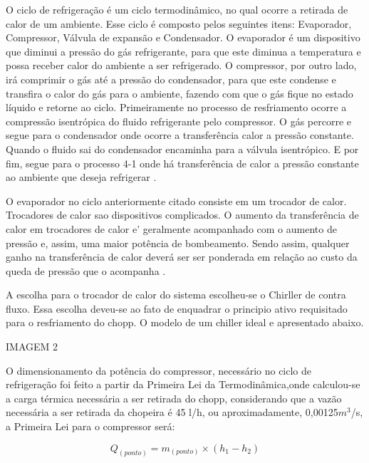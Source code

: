             O ciclo de refrigeração é um ciclo termodinâmico, no qual ocorre a retirada de calor de
            um ambiente. Esse ciclo é composto pelos seguintes itens: Evaporador, Compressor, Válvula
            de expansão e Condensador. O evaporador é um dispositivo que diminui a pressão do gás
            refrigerante, para que este diminua a temperatura e possa receber calor do ambiente a ser
            refrigerado. O compressor, por outro lado, irá comprimir o gás até a pressão do condensador,
            para que este condense e transfira o calor do gás para o ambiente, fazendo com que o gás
            fique no estado líquido e retorne ao ciclo. Primeiramente no processo de resfriamento ocorre a
            compressão isentrópica do fluido refrigerante pelo compressor. O gás percorre e segue para o
            condensador onde ocorre a transferência calor a pressão constante. Quando o fluido sai do
            condensador encaminha para a válvula isentrópico. E por fim, segue para o processo 4-1 onde
            há transferência de calor a pressão constante ao ambiente que deseja refrigerar \cite{boles}.

            O evaporador no ciclo anteriormente citado consiste em um trocador de calor.
            Trocadores de calor sao dispositivos complicados. O aumento da transferência de calor em
            trocadores de calor e’ geralmente acompanhado com o aumento de pressão e, assim, uma
            maior potência de bombeamento. Sendo assim, qualquer ganho na transferência de calor
            deverá ser ser ponderada em relação ao custo da queda de pressão que o acompanha \cite{boles}.

            A escolha para o trocador de calor do sistema escolheu-se o Chirller de contra fluxo.
            Essa escolha deveu-se ao fato de enquadrar o principio ativo requisitado para o resfriamento
            do chopp. O modelo de um chiller ideal e apresentado abaixo.

            IMAGEM 2

            O dimensionamento da potência do compressor, necessário no ciclo de
            refrigeração foi feito a partir da Primeira Lei da Termodinâmica,onde calculou-se a
            carga térmica necessária a ser retirada do chopp, considerando que a vazão
            necessária a ser retirada da chopeira é 45 l/h, ou aproximadamente, 0,00125$m^3$/s, a
            Primeira Lei para o compressor será:

            \begin{equation}
                Q_{(ponto)} = m_{(ponto)} \times (h_1 - h_2)
            \end{equation}

